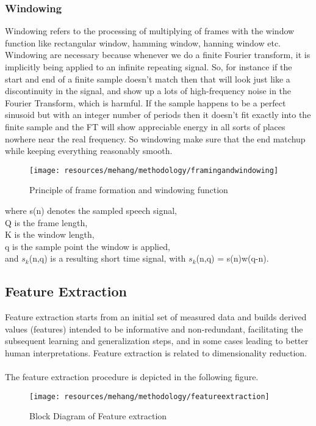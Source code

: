 \subsubsection{Windowing}
Windowing refers to the processing of multiplying of frames with the window function like rectangular window, hamming window, hanning window etc. Windowing are necessary because whenever we do a finite Fourier transform, it is implicitly being applied to an infinite repeating signal. So, for instance if the start and end of a finite sample doesn’t match then that will look just like a discontinuity in the signal, and show up a lots of high-frequency noise in the Fourier Transform, which is harmful. If the sample happens to be a perfect sinusoid but with an integer number of periods then it doesn’t fit exactly into the finite sample and the FT will show appreciable energy in all sorts of places nowhere near the real frequency. So windowing make sure that the end matchup while keeping everything reasonably smooth.
\begin{figure}[h!]
        \centering
        \texttt{[image: resources/mehang/methodology/framingandwindowing]}
        \caption{Principle of frame formation and windowing function}
\end{figure}
where s(n) denotes the sampled speech signal,\\
Q is the frame length,\\
K is the window length,\\
q is the sample point the window is applied,\\
and $s_k$(n,q) is a resulting short time signal, with $s_k$(n,q) = s(n)w(q-n).

\subsection{Feature Extraction}
Feature extraction starts from an initial set of measured data and builds derived values (features) intended to be informative and non-redundant, facilitating the subsequent learning and generalization steps, and in some cases leading to better human interpretations. Feature extraction is related to dimensionality reduction.\\
\\
The feature extraction procedure is depicted in the following figure.
\begin{figure}[h!]
        \centering
        \texttt{[image: resources/mehang/methodology/featureextraction]}
        \caption{Block Diagram of Feature extraction}
\end{figure}

